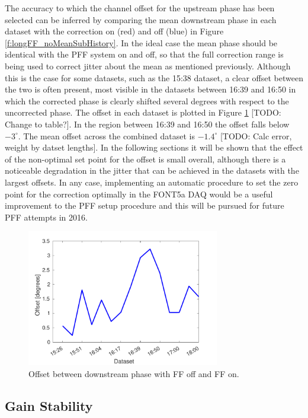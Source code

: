 The accuracy to which the channel offset for the upstream phase has been selected can be inferred by comparing the mean downstream phase in each dataset with the correction on (red) and off (blue) in Figure \ref{f:longFF_noMeanSubHistory}. In the ideal case the mean phase should be identical with the PFF system on and off, so that the full correction range is being used to correct jitter about the mean as mentioned previously. Although this is the case for some datasets, such as the 15:38 dataset, a clear offset between the two is often present, most visible in the datasets between 16:39 and 16:50 in which the corrected phase is clearly shifted several degrees with respect to the uncorrected phase. The offset in each dataset is plotted in Figure \ref{f:longFF_phaseOffset} [TODO: Change to table?]. In the region between 16:39 and 16:50 the offset falls below \(-3^\circ\). The mean offset across the combined dataset is \(-1.4^\circ\) [TODO: Calc error, weight by datset lengths]. In the following sections it will be shown that the effect of the non-optimal set point for the offset is small overall, although there is a noticeable degradation in the jitter that can be achieved in the datasets with the largest offsets. In any case, implementing an automatic procedure to set the zero point for the correction optimally in the FONT5a DAQ would be a useful improvement to the PFF setup procedure and this will be pursued for future PFF attempts in 2016.

\begin{figure}
  \centering
  \includegraphics[width=0.75\textwidth]{Figures/feedforward/longFF_phaseOffset}
  \caption{Offset between downstream phase with FF off and FF on.}
  \label{f:longFF_phaseOffset}
\end{figure}


\subsection{Gain Stability}
\label{ss:longFF_gain}

